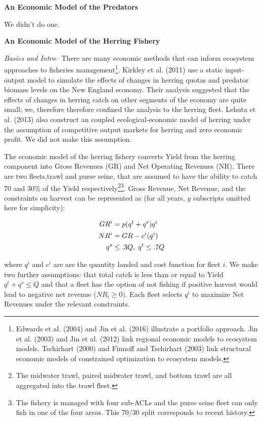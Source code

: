 \documentclass[]{article}
\let\rmarkdownfootnote\footnote%
\def\footnote{\protect\rmarkdownfootnote}
\begin{document}
\textbf{An Economic Model of the Predators}

We didn't do one.

\textbf{An Economic Model of the Herring Fishery}

\emph{Basics and Intro--} There are many economic methods that can
inform ecosystem approaches to fisheries management\footnote{Edwards et
  al. (2004) and Jin et al. (2016) illustrate a portfolio approach. Jin
  et al. (2003) and Jin et al. (2012) link regional economic models to
  ecosystem models. Tschirhart (2000) and Finnoff and Tschirhart (2003)
  link structural economic models of constrained optimization to
  ecosystem models.}. Kirkley et al. (2011) use a static input-output
model to simulate the effects of changes in herring quotas and predator
biomass levels on the New England economy. Their analysis suggested that
the effects of changes in herring catch on other segments of the economy
are quite small; we, therefore therefore confined the analysis to the
herring fleet. Lehuta et al. (2013) also construct an coupled
ecological-economic model of herring under the assumption of competitive
output markets for herring and zero economic profit. We did not make
this assumption.

The economic model of the herring fishery converts Yield from the
herring component into Gross Revenues (GR) and Net Operating Revenues
(NR). There are two fleets,trawl and purse seine, that are assumed to
have the ability to catch 70 and 30\% of the Yield
respectively\footnote{The midwater trawl, paired midwater trawl, and
  bottom trawl are all aggregated into the trawl fleet.}\footnote{The
  fishery is managed with four sub-ACLs and the purse seine fleet can
  only fish in one of the four areas. This 70/30 split corresponds to
  recent history.}. Gross Revenue, Net Revenue, and the constraints on
harvest can be represented as (for all years, \(y\) subscripts omitted
here for simplicity):

\begin{align}
GR^i&=p(q^t+q^s)q^i\\
NR^i&=GR-c^i(q^i)\\
q^s &\leq .3Q, \hspace{1mm} q^t \leq .7Q
\end{align}

where \(q^i\) and \(c^i\) are are the quantity landed and cost function
for fleet \(i\). We make two further assumptions: that total catch is
less than or equal to Yield \(q^t+q^s \leq Q\) and that a fleet has the
option of not fishing if positive harvest would lead to negative net
revenue (\(NR_i \geq 0\)). Each fleet selects \(q^i\) to maximize Net
Revenues under the relevant constraints.\\
\end{document}
